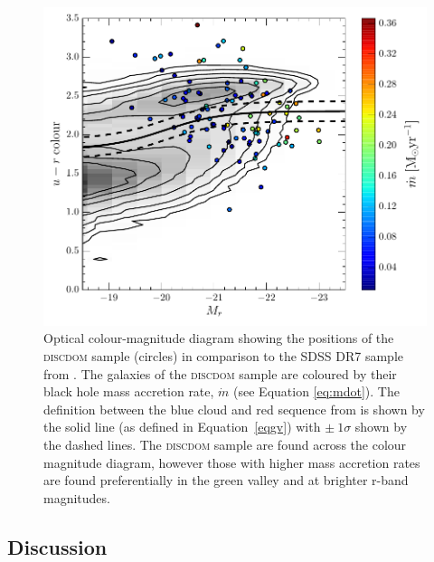 {\begin{figure}
\centering
\includegraphics[width=\textwidth]{agn/CMD_DISCDOM_coloured_accretion_rate.pdf}
\caption[Colour-magnitude diagram for the DISCDOM sample, coloured by black hole mass accretion rate]{Optical colour-magnitude diagram showing the positions of the \textsc{discdom} sample (circles) in comparison to the SDSS DR7 sample from \citet{Baldry04}. The galaxies of the \textsc{discdom} sample are coloured by their black hole mass accretion rate, $\dot{m}$ (see Equation \ref{eq:mdot}). The definition between the blue cloud and red sequence  from \citet{Baldry04} is shown by the solid line (as defined in Equation~\ref{eqgv}) with $\pm~1\sigma$ shown by the dashed lines. The \textsc{discdom} sample are found across the colour magnitude diagram, however those with higher mass accretion rates are found preferentially in the green valley and at brighter r-band magnitudes.}
\label{fig:cmdmdot}
\end{figure}


%
%  
\subsection{Discussion}\label{sec:intdiscussion}
%
%

}
